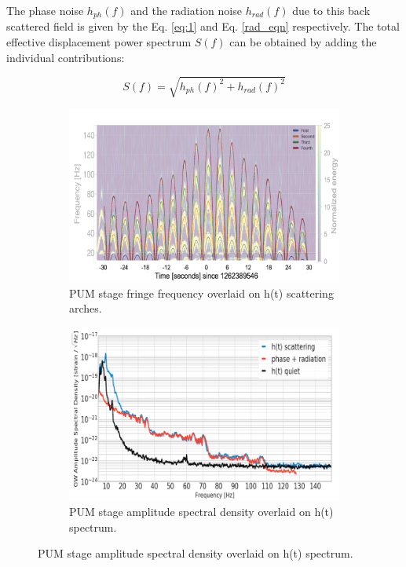 \documentclass[12pt]{iopart}
\begin{document}
The phase noise $h_{ph}
(f)$ and the radiation noise $h_{rad}(f)$ due to this back scattered field is given by the Eq. \ref{eq:1} and Eq. \ref{rad_eqn} respectively. 
The total effective displacement power spectrum $S(f)$ can be obtained by adding the individual contributions:

\begin{equation}
S(f) = \sqrt{h_{ph}(f)^2 + h_{rad}(f)^2} \label{total_noise}
\end{equation}



\begin{figure}[h]
\captionsetup[subfigure]{font=scriptsize,labelfont=scriptsize}
   \centering
    \begin{subfigure}[b]{0.45\textwidth}
        \centering
         \includegraphics[width= \textwidth]{fringe_l2c.png}
         \caption{PUM stage fringe frequency overlaid on h(t) scattering arches.}
         \label{fig:fringel2}
    \end{subfigure}
    \hfill
    \begin{subfigure}[b]{0.44\textwidth}
        \centering
         \includegraphics[width =\textwidth]{spectrum_l2new3.png}
         \caption{PUM stage amplitude spectral density overlaid on h(t) spectrum.}
         \label{fig:spectruml2}
         

\end{subfigure}
\end{figure}
\end{document}
